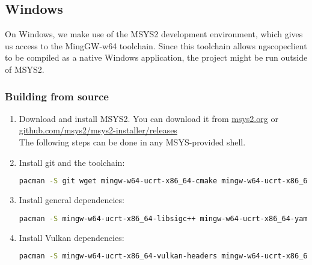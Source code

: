 \subsection{Windows}

On Windows, we make use of the MSYS2 development environment, which gives us access to the MingGW-w64 toolchain.
Since this toolchain allows ngscopeclient to be compiled as a native Windows application, the project might be run
outside of MSYS2.

\subsubsection{Building from source}

\begin{enumerate}

\item Download and install MSYS2. You can download it from \href{https://www.msys2.org/}{msys2.org} or
\href{https://github.com/msys2/msys2-installer/releases}{github.com/msys2/msys2-installer/releases}\\


The following steps can be done in any MSYS-provided shell.


\item Install git and the toolchain:
\begin{lstlisting}[language=sh, numbers=none]
pacman -S git wget mingw-w64-ucrt-x86_64-cmake mingw-w64-ucrt-x86_64-toolchain
\end{lstlisting}

\item Install general dependencies:
\begin{lstlisting}[language=sh, numbers=none]
pacman -S mingw-w64-ucrt-x86_64-libsigc++ mingw-w64-ucrt-x86_64-yaml-cpp mingw-w64-ucrt-x86_64-glfw mingw-w64-ucrt-x86_64-catch mingw-w64-ucrt-x86_64-hidapi mingw-w64-ucrt-x86_64-libpng
\end{lstlisting}

\item Install Vulkan dependencies:
\begin{lstlisting}[language=sh, numbers=none]
pacman -S mingw-w64-ucrt-x86_64-vulkan-headers mingw-w64-ucrt-x86_64-vulkan-loader mingw-w64-ucrt-x86_64-shaderc mingw-w64-ucrt-x86_64-glslang mingw-w64-ucrt-x86_64-spirv-tools
\end{lstlisting}


\end{enumerate}
